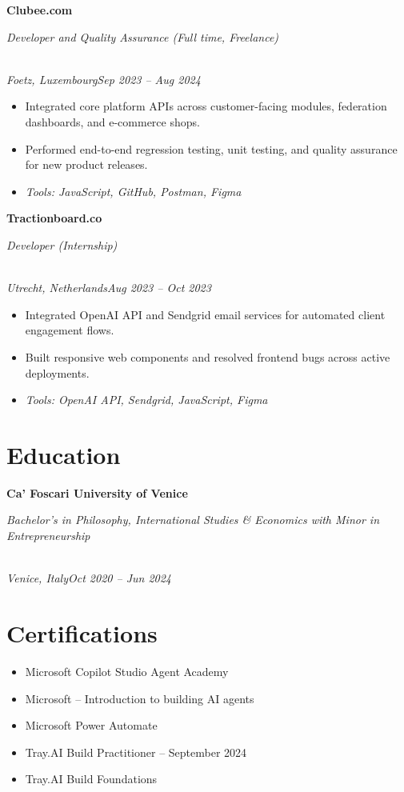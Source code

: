\documentclass[a4paper,10pt]{article}
\newcommand{\role}[4]{\vspace{3pt}\noindent\hspace{0.6em}\parbox[t]{0.38\textwidth}{\raggedright\textbf{#1}}\hfill\parbox[t]{0.58\textwidth}{\raggedleft\textit{#2}}\\{\textit{#3}\hfill\textit{#4}}\vspace{1pt}}
\begin{document}
\role{Clubee.com}{Developer and Quality Assurance (Full time, Freelance)}{Foetz, Luxembourg}{Sep 2023 -- Aug 2024}
\begin{itemize}
\item Integrated core platform APIs across customer-facing modules, federation dashboards, and e-commerce shops.
\item Performed end-to-end regression testing, unit testing, and quality assurance for new product releases.
\item \textit{Tools: JavaScript, GitHub, Postman, Figma}
\end{itemize}

\role{Tractionboard.co}{Developer (Internship)}{Utrecht, Netherlands}{Aug 2023 -- Oct 2023}
\begin{itemize}
\item Integrated OpenAI API and Sendgrid email services for automated client engagement flows.
\item Built responsive web components and resolved frontend bugs across active deployments.
\item \textit{Tools: OpenAI API, Sendgrid, JavaScript, Figma}
\end{itemize}

\section{Education}
\role{Ca' Foscari University of Venice}{Bachelor's in Philosophy, International Studies \& Economics with Minor in Entrepreneurship}{Venice, Italy}{Oct 2020 -- Jun 2024}

\section{Certifications}
\begin{itemize}
\item Microsoft Copilot Studio Agent Academy
\item Microsoft -- Introduction to building AI agents
\item Microsoft Power Automate
\item Tray.AI Build Practitioner -- September 2024
\item Tray.AI Build Foundations
\end{itemize}
\end{document}
